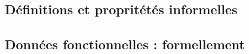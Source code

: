 \subsection{Définitions et propritétés informelles}
\label{sec:informel}


\subsection{Données fonctionnelles : formellement}

